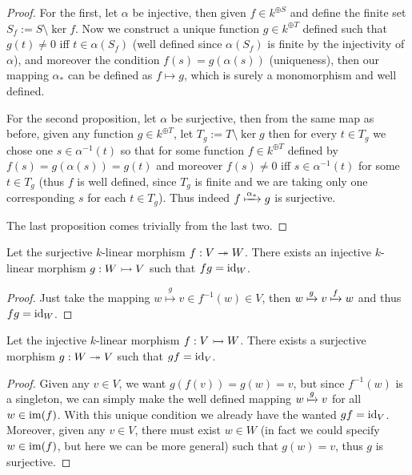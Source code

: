 \begin{proof}
  For the first, let \(\alpha\) be injective, then given \(f \in k^{\oplus S}\)
  and define the finite set \(S_f := S \setminus \ker f\). Now we construct a
  unique function \(g \in k^{\oplus T}\) defined such that \(g(t) \neq 0\) iff
  \(t \in \alpha(S_f)\) (well defined since \(\alpha(S_f)\) is finite by the
  injectivity of \(\alpha\)), and moreover the condition \(f(s) =
  g(\alpha(s))\) (uniqueness), then our mapping \(\alpha_{\ast}\) can be
  defined as \(f \mapsto g\), which is surely a monomorphism and well defined.

  For the second proposition, let \(\alpha\) be surjective, then from the same
  map as before, given any function \(g \in k^{\oplus T}\), let  \(T_g := T
  \setminus \ker g\) then for every \(t \in T_g\) we chose one \(s \in
  \alpha^{-1}(t)\) so that for some function \(f \in k^{\oplus T}\) defined by
  \(f(s) = g(\alpha(s)) = g(t)\) and moreover \(f(s) \neq 0\) iff \(s \in
  \alpha^{-1}(t)\) for some \(t \in T_g\) (thus \(f\) is well defined, since
  \(T_g\) is finite and we are taking only one corresponding \(s\) for each \(t
  \in T_g\)). Thus indeed \(f \xmapsto{\alpha_\ast} g\) is surjective.

  The last proposition comes trivially from the last two.
\end{proof}

\begin{proposition}
  Let the surjective \(k\)-linear morphism \(f: V \twoheadrightarrow W\). There
  exists an injective \(k\)-linear morphism \(g: W \rightarrowtail V\) such
  that \(f  g = \operatorname{id}_{W}\).
\end{proposition}

\begin{proof}
  Just take the mapping \(w \overset g \longmapsto v \in f^{-1}(w) \in V\), then
  \(w \xmapsto g v \xmapsto f w\) and thus \(f  g = \operatorname{id}_W\).
\end{proof}

\begin{proposition}
  Let the injective \(k\)-linear morphism \(f: V \rightarrowtail W\). There
  exists a surjective morphism \(g : W \twoheadrightarrow V\) such that \(g
   f = \operatorname{id}_V\).
\end{proposition}

\begin{proof}
  Given any \(v \in V\), we want \(g(f(v)) = g(w) = v\), but since \(f^{-1}(w)\)
  is a singleton, we can simply make the well defined mapping \(w \xmapsto g v\)
  for all \(w \in \operatorname{im}(f)\). With this unique condition we already have the
  wanted \(g  f = \operatorname{id}_V\). Moreover, given any \(v \in V\), there must
  exist \(w \in W\) (in fact we could specify \(w \in \operatorname{im}(f)\), but here we can
  be more general) such that \(g(w) = v\), thus \(g\) is surjective.
\end{proof}


